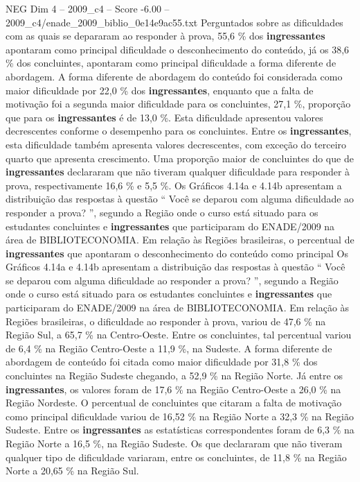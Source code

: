 \begin{textsample}{NEG Dim 4 – 2009\_c4 – Score -6.00 – 2009\_c4/enade\_2009\_biblio\_0e14e9ac55.txt}
Perguntados sobre as dificuldades com as quais se depararam ao responder à prova, 55,6 \% dos \textbf{ingressantes} apontaram como principal dificuldade o desconhecimento do conteúdo, já os 38,6 \% dos concluintes, apontaram como principal dificuldade a forma diferente de abordagem.
A forma diferente de abordagem do conteúdo foi considerada como maior dificuldade por 22,0 \% dos \textbf{ingressantes}, enquanto que a falta de motivação foi a segunda maior dificuldade para os concluintes, 27,1 \%, proporção que para os \textbf{ingressantes} é de 13,0 \%.
Esta dificuldade apresentou valores decrescentes conforme o desempenho para os concluintes.
Entre os \textbf{ingressantes}, esta dificuldade também apresenta valores decrescentes, com exceção do terceiro quarto que apresenta crescimento.
Uma proporção maior de concluintes do que de \textbf{ingressantes} declararam que não tiveram qualquer dificuldade para responder à prova, respectivamente 16,6 \% e 5,5 \%.
Os Gráficos 4.14a e 4.14b apresentam a distribuição das respostas à questão “ Você se deparou com alguma dificuldade ao responder a prova? ”, segundo a Região onde o curso está situado para os estudantes concluintes e \textbf{ingressantes} que participaram do ENADE/2009 na área de BIBLIOTECONOMIA.
Em relação às Regiões brasileiras, o percentual de \textbf{ingressantes} que apontaram o desconhecimento do conteúdo como principal Os Gráficos 4.14a e 4.14b apresentam a distribuição das respostas à questão “ Você se deparou com alguma dificuldade ao responder a prova? ”, segundo a Região onde o curso está situado para os estudantes concluintes e \textbf{ingressantes} que participaram do ENADE/2009 na área de BIBLIOTECONOMIA.
Em relação às Regiões brasileiras, o dificuldade ao responder à prova, variou de 47,6 \% na Região Sul, a 65,7 \% na Centro-Oeste.
Entre os concluintes, tal percentual variou de 6,4 \% na Região Centro-Oeste a 11,9 \%, na Sudeste.
A forma diferente de abordagem de conteúdo foi citada como maior dificuldade por 31,8 \% dos concluintes na Região Sudeste chegando, a 52,9 \% na Região Norte.
Já entre os \textbf{ingressantes}, os valores foram de 17,6 \% na Região Centro-Oeste a 26,0 \% na Região Nordeste.
O percentual de concluintes que citaram a falta de motivação como principal dificuldade variou de 16,52 \% na Região Norte a 32,3 \% na Região Sudeste.
Entre os \textbf{ingressantes} as estatísticas correspondentes foram de 6,3 \% na Região Norte a 16,5 \%, na Região Sudeste.
Os que declararam que não tiveram qualquer tipo de dificuldade variaram, entre os concluintes, de 11,8 \% na Região Norte a 20,65 \% na Região Sul.

\end{textsample}
